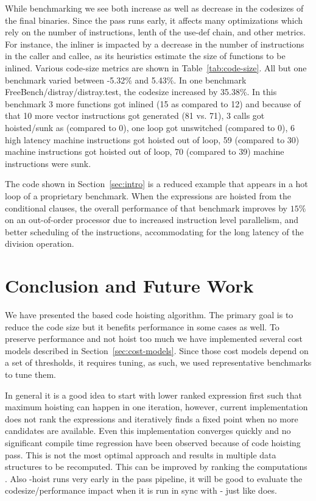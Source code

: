 \documentclass[acmlarge,review]{acmart}\settopmatter{printfolios=true}
\begin{document}
While benchmarking \LLVMTestSuite{} we see both increase as well as decrease in
the codesizes of the final binaries. Since the pass runs early, it affects many
optimizations which rely on the number of instructions, lenth of the use-def
chain, and other metrics. For instance, the inliner is impacted by a decrease in
the number of instructions in the caller and callee, as its heuristics estimate
the size of functions to be inlined. Various code-size metrics are shown in
Table~\ref{tab:code-size}. All but one benchmark varied between -5.32\% and
5.43\%.  In one benchmark FreeBench/distray/distray.test, the codesize increased
by 35.38\%. In this benchmark 3 more functions got inlined (15 as compared to
12) and because of that 10 more vector instructions got generated (81 vs. 71), 3
calls got hoisted/sunk as (compared to 0), one loop got unswitched (compared to
0), 6 high latency machine instructions got hoisted out of loop, 59 (compared to
30) machine instructions got hoisted out of loop, 70 (compared to 39) machine
instructions were sunk.

The code shown in Section~\ref{sec:intro} is a reduced example that appears in a
hot loop of a proprietary benchmark.  When the expressions are hoisted from the
conditional clauses, the overall performance of that benchmark improves by
$15\%$ on an out-of-order processor due to increased instruction level
parallelism, and better scheduling of the instructions, accommodating for the
long latency of the division operation.

\section{Conclusion and Future Work}
\label{sec:future-work}
We have presented the \GVN{} based code hoisting algorithm. The primary goal is to
reduce the code size but it benefits performance in some cases as well. To
preserve performance and not hoist too much we have implemented several cost
models described in Section~\ref{sec:cost-models}. Since those cost models
depend on a set of thresholds, it requires tuning, as such, we used
representative benchmarks to tune them.

In general it is a good idea to start with lower ranked expression first such
that maximum hoisting can happen in one iteration, however, current
implementation does not rank the expressions and iteratively finds a fixed point
when no more candidates are available. Even this implementation converges
quickly and no significant compile time regression have been observed because of
code hoisting pass. This is not the most optimal approach and results in
multiple data structures to be recomputed. This can be improved by ranking the
computations \cite{rosen1988global}. Also \GVN{}-hoist runs very early in the
pass pipeline, it will be good to evaluate the codesize/performance impact when
it is run in sync with \GVN{}-\PRE{} just like \GCC{} does.
\end{document}
